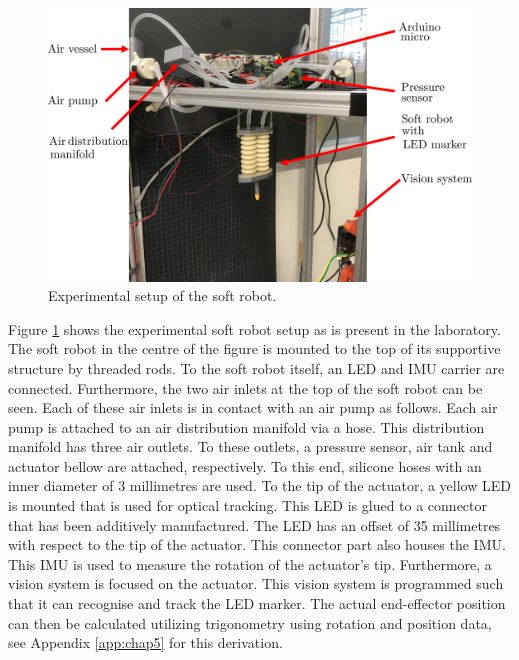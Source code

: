 \begin{figure}[H]
    \centering
    \includegraphics[width = \textwidth]{Figures/Chapter5/expsetup.png}
    \caption{Experimental setup of the soft robot.}
    \label{fig5:setup}
\end{figure}

Figure \ref{fig5:setup} shows the experimental soft robot setup as is present in the laboratory. The soft robot in the centre of the figure is mounted to the top of its supportive structure by threaded rods. To the soft robot itself, an LED and IMU carrier are connected. Furthermore, the two air inlets at the top of the soft robot can be seen. Each of these air inlets is in contact with an air pump as follows. Each air pump is attached to an air distribution manifold via a hose. This distribution manifold has three air outlets. To these outlets, a pressure sensor, air tank and actuator bellow are attached, respectively. To this end, silicone hoses with an inner diameter of 3 millimetres are used. To the tip of the actuator, a yellow LED is mounted that is used for optical tracking. This LED is glued to a connector that has been additively manufactured. The LED has an offset of 35 millimetres with respect to the tip of the actuator. This connector part also houses the IMU. This IMU is used to measure the rotation of the actuator's tip. Furthermore, a vision system is focused on the actuator. This vision system is programmed such that it can recognise and track the LED marker. The actual end-effector position can then be calculated utilizing trigonometry using rotation and position data, see Appendix \ref{app:chap5} for this derivation.



